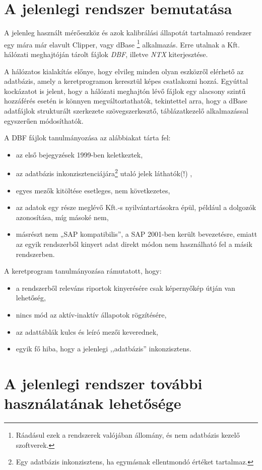 \documentclass[a4paper,12pt]{report}
\begin{document}
\section{A jelenlegi rendszer bemutatása}
A jelenleg használt mérőeszköz és azok kalibrálási állapotát tartalmazó rendszer 
egy mára már elavult Clipper, vagy dBase \footnote{Ráadásul ezek a rendszerek valójában állomány, és nem adatbázis kezelő szoftverek.} alkalmazás. Erre utalnak a Kft.
hálózati meghajtóján tárolt fájlok \textit{DBF}, illetve \textit{NTX} 
kiterjesztése. 

A hálózatos kialakítás előnye, hogy elvileg minden olyan eszközről elérhető az
adatbázis, amely a keretprogramon keresztül képes csatlakozni hozzá. Egyúttal 
kockázatot is jelent, hogy a hálózati meghajtón lévő fájlok egy alacsony szintű 
hozzáférés esetén is könnyen megváltoztathatók, tekintettel arra, hogy a dBase 
adatfájlok strukturált szerkezete szövegszerkesztő, táblázatkezelő 
alkalmazással egyszerűen módosíthatók.

A DBF fájlok tanulmányozása az alábbiakat tárta fel:
\begin{itemize}
\item az első bejegyzések 1999-ben keletkeztek,
\item az adatbázis inkonzisztenciájára\footnote{Egy adatbázis inkonzisztens, ha egymásnak ellentmondó értéket tartalmaz.} utaló jelek láthatók(!) ,
\item egyes mezők kitöltése esetleges, nem következetes,
\item az adatok egy része meglévő Kft.-s nyilvántartásokra épül, például a
dolgozók azonosítása, míg másoké nem,
\item másrészt nem „SAP kompatibilis”, a SAP 2001-ben került bevezetésre, emiatt 
az egyik rendszerből kinyert adat direkt módon nem használható fel a másik 
rendszerben.
\end{itemize}
A keretprogram tanulmányozása rámutatott, hogy:
\begin{itemize}
\item a rendszerből releváns riportok kinyerésére csak képernyőkép útján van
lehetőség,
\item nincs mód az aktív-inaktív állapotok rögzítésére,
\item az adattáblák kulcs és leíró mezői keverednek,
\item egyik fő hiba, hogy a jelenlegi ,,adatbázis'' inkonzisztens.
\end{itemize}

\section{A jelenlegi rendszer további használatának lehetősége}
\end{document}

